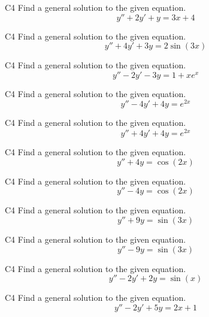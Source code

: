 \begin{problem}{C4}
Find a general solution to the given equation.
\[
y'' + 2y' + y = 3x + 4
\]
\end{problem}


\begin{problem}{C4}
Find a general solution to the given equation.
\[
y'' + 4y' + 3y = 2\sin(3x)
\]
\end{problem}


\begin{problem}{C4}
Find a general solution to the given equation.
\[
y'' - 2y' - 3y = 1 + xe^x
\]
\end{problem}


\begin{problem}{C4}
Find a general solution to the given equation.
\[
y'' - 4y' + 4y = e^{2x}
\]
\end{problem}

\begin{problem}{C4}
Find a general solution to the given equation.
\[
y'' + 4y' + 4y = e^{2x}
\]
\end{problem}




\begin{problem}{C4}
Find a general solution to the given equation.
\[
y'' + 4y = \cos(2x)
\]
\end{problem}

\begin{problem}{C4}
Find a general solution to the given equation.
\[
y'' - 4y = \cos(2x)
\]
\end{problem}


\begin{problem}{C4}
Find a general solution to the given equation.
\[
y'' + 9y = \sin(3x)
\]
\end{problem}

\begin{problem}{C4}
Find a general solution to the given equation.
\[
y'' - 9y = \sin(3x)
\]
\end{problem}


\begin{problem}{C4}
Find a general solution to the given equation.
\[
y'' - 2y' + 2y = \sin(x)
\]
\end{problem}


\begin{problem}{C4}
Find a general solution to the given equation.
\[
y'' - 2y' + 5y = 2x + 1
\]
\end{problem}



